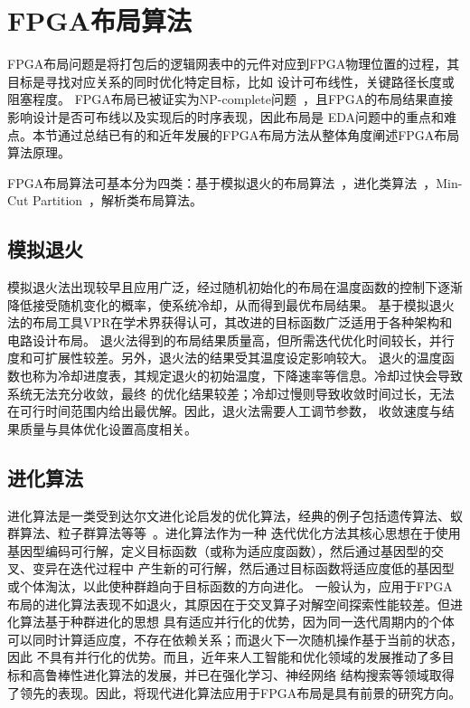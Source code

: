 \section{FPGA布局算法}

FPGA布局问题是将打包后的逻辑网表中的元件对应到FPGA物理位置的过程，其目标是寻找对应关系的同时优化特定目标，比如
设计可布线性，关键路径长度或阻塞程度。
FPGA布局已被证实为NP-complete问题~\cite{panchal2015solving}，且FPGA的布局结果直接影响设计是否可布线以及实现后的时序表现，因此布局是
EDA问题中的重点和难点。本节通过总结已有的和近年发展的FPGA布局方法从整体角度阐述FPGA布局算法原理。


FPGA布局算法可基本分为四类：基于模拟退火的布局算法~\cite{eguro_retime,kirkpatrick1983optimization}，进化类算法~\cite{yang2005fpga,venkatraman2000evolutionary,jamieson2013supergenes,wang2009ant}，Min-Cut Partition~\cite{maidee2005timing}，解析类布局算法\cite{gort_analytical-placement_fpl2012,abuowaimer2018gplace3}。

\subsection{模拟退火}
模拟退火法出现较早且应用广泛，经过随机初始化的布局在温度函数的控制下逐渐降低接受随机变化的概率，使系统冷却，从而得到最优布局结果。
基于模拟退火法的布局工具VPR在学术界获得认可，其改进的目标函数广泛适用于各种架构和电路设计布局。
退火法得到的布局结果质量高，但所需迭代优化时间较长，并行度和可扩展性较差。另外，退火法的结果受其温度设定影响较大。
退火的温度函数也称为冷却进度表，其规定退火的初始温度，下降速率等信息。冷却过快会导致系统无法充分收敛，最终
的优化结果较差；冷却过慢则导致收敛时间过长，无法在可行时间范围内给出最优解。因此，退火法需要人工调节参数，
收敛速度与结果质量与具体优化设置高度相关。


\subsection{进化算法}
进化算法是一类受到达尔文进化论启发的优化算法，经典的例子包括遗传算法、蚁群算法、粒子群算法等等~\cite{DBLP:journals/corr/abs-1906-08870}。进化算法作为一种
迭代优化方法其核心思想在于使用基因型编码可行解，定义目标函数（或称为适应度函数），然后通过基因型的交叉、变异在迭代过程中
产生新的可行解，然后通过目标函数将适应度低的基因型或个体淘汰，以此使种群趋向于目标函数的方向进化。
一般认为，应用于FPGA布局的进化算法表现不如退火，其原因在于交叉算子对解空间探索性能较差。但进化算法基于种群进化的思想
具有适应并行化的优势，因为同一迭代周期内的个体可以同时计算适应度，不存在依赖关系；而退火下一次随机操作基于当前的状态，因此
不具有并行化的优势。而且，近年来人工智能和优化领域的发展推动了多目标和高鲁棒性进化算法的发展，并已在强化学习、神经网络
结构搜索等领域取得了领先的表现。因此，将现代进化算法应用于FPGA布局是具有前景的研究方向。

